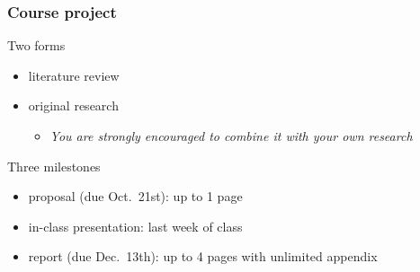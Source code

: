 \documentclass[compress,
mathserif,wide,%
]{beamer}
\begin{document}
\begin{frame}
\frametitle{Course project}

Two forms
\begin{itemize}
\itemsep0.5em
\item literature review
\item original research
\begin{itemize}
  \item \alert{\em You are strongly encouraged to combine it with your own research}
\end{itemize}
\end{itemize}

\pause
\vfill

Three milestones

\begin{itemize}
\itemsep0.5em
\item proposal (due Oct.~21st): up to 1 page
\item in-class presentation: last week of class
\item report (due Dec.~13th): up to 4 pages with unlimited appendix
\end{itemize}


\end{frame}












\end{document}
